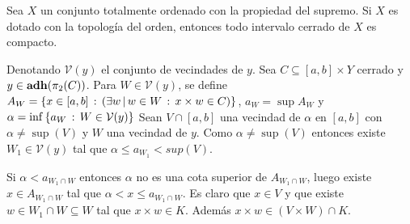 \documentclass[10pt]{beamer}
\begin{document}
\begin{frame}
  \begin{theorem}
  Sea $X$ un conjunto totalmente ordenado con la propiedad del supremo. Si $X$
  es dotado con la topología del orden, entonces todo intervalo cerrado de $X$
  es compacto.
\end{theorem}
  Denotando $\mathcal{V}(y)$ el conjunto de vecindades de $y$.
  Sea $C\subseteq[a,b]\times Y$ cerrado y $y\in\operatorname{\mathrm{\mathbf{adh}}}(\pi_2(C))$. Para $W\in\mathcal{V}(y)$,
  se define $A_W=\set{x\in[a,b]}{\Exists{w}[w\in W]{x\times w\in C}}$,
  $a_W=\sup A_W$ y $\alpha=\inf\left\{a_W\,:\,W\in\mathcal{V}(y)\right\}$
  Sean $V\cap [a,b]$ una vecindad de $\alpha$ en $[a,b]$ con $\alpha \neq \sup(V)$
  y $W$ una vecindad de $y$. Como $\alpha \neq \sup(V)$ entonces existe $W_1 \in \mathcal{V}(y)$
  tal que $\alpha \leq a_{W_1} < sup(V)$.
  
  Si $\alpha < a_{W_1\cap W}$ entonces $\alpha$ no es una cota superior de $A_{W_1\cap W}$,
  luego existe $x\in A_{W_1\cap W}$ tal que $\alpha < x \leq a_{W_1\cap W}$. Es claro que 
  $x \in V$ y que existe $w \in W_1\cap W \subseteq W$ tal que $x\times w \in K$. 
  Además $x\times w \in (V\times W)\cap K$. 
\end{frame}
\end{document}
